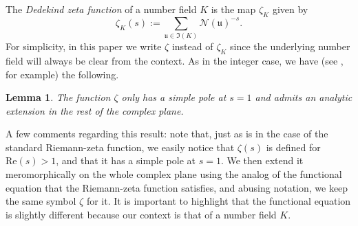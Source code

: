 \documentclass[11pt]{amsart}
\newtheorem{lemma}{Lemma}[section]
\theoremstyle{definition}
\newcommand{\NN}{{\mathcal N}}
\newcommand{\mf}{\mathfrak}
\begin{document}
  

  The \emph{Dedekind zeta function} of a number field $K$ is the map $\zeta_K$ given by
 \begin{equation}\label{d1}
    \zeta_K(s):=\sum_{\mf u\in \mf I (K)}\NN(\mf u)^{-s}.
 \end{equation}
For simplicity, in this paper we write $\zeta$ instead of $\zeta_{K}$ since the underlying number field will always be clear from the context.
  As in the integer case, we have (see \cite[Theorem~5.11]{neukirch99}, for example) the following.
  
 \begin{lemma}\label{zp}
     The function $\zeta$ only has a simple pole at $s=1$ and admits an analytic extension in the rest of the complex plane.
 \end{lemma}
A few comments regarding this result: note that, just as is in the case of the standard Riemann-zeta function, we easily notice that $\zeta(s)$ is defined for $\text{Re}(s)>1$, and that it has a simple pole at $s=1$. We then extend it meromorphically on the whole complex plane using the analog of the functional equation that the Riemann-zeta function satisfies, and abusing notation, we keep the same symbol $\zeta$ for it. It is important to highlight that the functional equation is slightly different because our context is that of a number field $K$.

\fi
\end{document}
